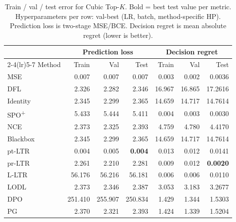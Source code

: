 \begin{table}[h]
\centering
\caption[Train/val/test error for Cubic Top-$K$.]{Train / val / test error for Cubic Top-$K$. Bold = best test value per metric. Hyperparameters per row: val-best (LR, batch, method-specific HP). Prediction loss is two-stage MSE/BCE. Decision regret is mean absolute regret (lower is better).}
\label{tab:err-cubic}
\setlength{\tabcolsep}{4pt}
\renewcommand{\arraystretch}{1.05}
\begin{tabular}{@{}lrrrrrr@{}}
\toprule
& \multicolumn{3}{c}{Prediction loss} & \multicolumn{3}{c}{Decision regret} \\
\cmidrule(lr){2-4}\cmidrule(lr){5-7}
Method & Train & Val & Test & Train & Val & Test \\
\midrule
MSE & 0.007 & 0.007 & 0.007 & 0.003 & 0.002 & 0.0036 \\
DFL & 2.326 & 2.282 & 2.346 & 16.967 & 16.865 & 17.2616 \\
Identity & 2.345 & 2.299 & 2.365 & 14.659 & 14.717 & 14.7614 \\
SPO\textsuperscript{+} & 5.433 & 5.444 & 5.411 & 0.004 & 0.003 & 0.0030 \\
NCE & 2.373 & 2.325 & 2.393 & 4.759 & 4.780 & 4.4170 \\
Blackbox & 2.345 & 2.299 & 2.365 & 14.659 & 14.717 & 14.7614 \\
pt-LTR & 0.004 & 0.005 & \textbf{0.004} & 0.013 & 0.012 & 0.0141 \\
pr-LTR & 2.261 & 2.210 & 2.281 & 0.009 & 0.012 & \textbf{0.0020} \\
L-LTR & 56.176 & 56.216 & 56.181 & 0.006 & 0.006 & 0.0110 \\
LODL & 2.373 & 2.346 & 2.387 & 3.053 & 3.183 & 3.2677 \\
DPO & 251.410 & 255.907 & 250.834 & 1.429 & 1.344 & 1.5303 \\
PG & 2.370 & 2.321 & 2.393 & 1.424 & 1.339 & 1.5204 \\
\bottomrule
\end{tabular}
\end{table}

